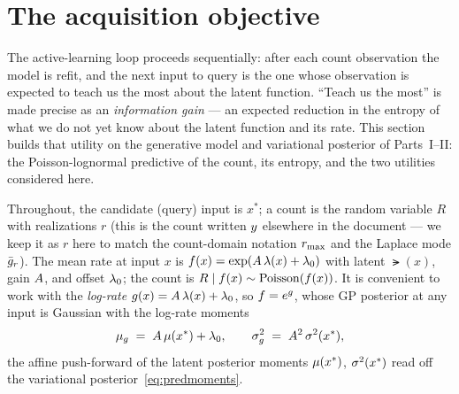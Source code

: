 
\section{The acquisition objective}\label{sec:utility}

The active-learning loop proceeds sequentially: after each count observation the
model is refit, and the next input to query is the one whose observation is
expected to teach us the most about the latent function. ``Teach us the most'' is
made precise as an \emph{information gain} --- an expected reduction in the entropy
of what we do not yet know about the latent function and its rate. This section
builds that utility on the generative model and variational posterior of
Parts~I--II: the Poisson-lognormal predictive of the count, its entropy, and the
two utilities considered here.

Throughout, the candidate (query) input is $x^{*}$; a count is the random variable
$R$ with realizations $r$ (this is the count written $y$ elsewhere in the
document --- we keep it as $r$ here to match the count-domain notation $r_{\max}$ and
the Laplace mode $\bar{g}_{r}$). The mean rate at input $x$ is
$f(x)=\exp(A\,\lambda(x)+\lambda_{0})$ with latent $\lat(x)$, gain $A$, and
offset $\lambda_{0}$; the count is $R\mid f(x)\sim\mathrm{Poisson}(f(x))$. It is convenient to
work with the \emph{log-rate} $g(x)=A\,\lambda(x)+\lambda_{0}$, so $f=e^{g}$,
whose GP posterior at any input is Gaussian with the log-rate moments
%
\begin{equation}
  \mu_{g} \;=\; A\,\mu(x^{*})+\lambda_{0},
  \qquad
  \sigma_{g}^{2} \;=\; A^{2}\,\sigma^{2}(x^{*}),
  \label{eq:logratemoments}
\end{equation}
%
the affine push-forward of the latent posterior moments $\mu(x^{*})$,
$\sigma^{2}(x^{*})$ read off the variational posterior~\eqref{eq:predmoments}.

